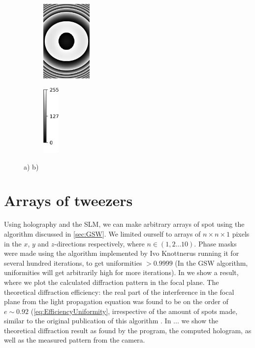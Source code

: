 \begin{figure}
\begin{subfigure}{.18\linewidth}
		\caption{}
		\label{fig:Flatness}
	\end{subfigure}
	\begin{subfigure}{.18\linewidth}
		\centering
		\includegraphics[height=4cm]{figures/SLMphase/zernike.jpg}
		\caption{}
		\label{fig:Zernike}
	\end{subfigure}
	\begin{subfigure}{0.055\linewidth}
	    \centering
	    \includegraphics[height = 3.5cm]{figures/SLMphase/colorbar.jpg}
	\end{subfigure}
	\caption{a) b)}
	\label{fig:SLMphase}
\end{figure}



\section{Arrays of tweezers}

Using holography and the SLM, we can make arbitrary arrays of spot using the algorithm discussed in \cref{sec:GSW}. 
We limited ourself to arrays of $n \times n \times 1$ pixels in the $x$, $y$ and $z$-directions respectively, where $n \in (1,2\ldots10)$. 
Phase masks were made using the algorithm implemented by Ivo Knottnerus running it for several hundred iterations, to get uniformities $>0.9999$ (In the \ac{GSW} algorithm, uniformities will get arbitrarily high for more iterations). 
In we show a result, where we plot the calculated diffraction pattern in the focal plane. The theoretical diffraction efficiency: the real part of the interference in the focal plane from the light propagation equation was found to be on the order of $e \sim 0.92$ (\cref{eq:EfficiencyUniformity}, irrespective of the amount of spots made, similar to the original publication of this algorithm \cite{DiLeonardo2007}.
In ... we show the theoretical diffraction result as found by the program, the computed hologram, as well as the measured pattern from the camera. 

